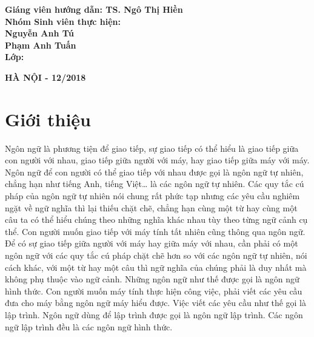\documentclass[14pt]{extreport}
\begin{document}
{\begin{center}
\end{center}
\begin{flushleft}
\vspace{1.3cm}
\hspace{1.5cm} \textbf{ Giáng viên hướng dẫn:{ TS. Ngô Thị Hiền }}\\[0.2cm]
\hspace{1.5cm} \textbf{ Nhóm Sinh viên thực hiện:}\\[0.2cm]
\hspace{5cm}\textbf{Nguyễn Anh Tú}\\[0.2cm]
\hspace{5cm}\textbf{Phạm Anh Tuấn}\\[0.2cm]
\hspace{1.5cm} \textbf{ Lớp:\hspace{2cm}{ KSTN Toán Tin K60}}\\
\end{flushleft}

\begin{center}
\textbf{{\small HÀ NỘI - 12/2018}}\\
\end{center}
 }
\thispagestyle{empty}
\newpage

\tableofcontents
\newpage


\newpage

\chapter{Giới thiệu}
Ngôn ngữ là phương tiện để giao tiếp, sự giao tiếp có thể hiểu là giao tiếp giữa con người với nhau, giao tiếp giữa người với máy, hay giao tiếp giữa máy với máy. Ngôn ngữ để con người có thể giao tiếp với nhau được gọi là ngôn ngữ tự nhiên, chẳng hạn như tiếng Anh, tiếng Việt… là các ngôn ngữ tự nhiên. Các quy tắc cú pháp của ngôn ngữ tự nhiên nói chung rất phức tạp nhưng các yêu cầu nghiêm ngặt về ngữ nghĩa thì lại thiếu chặt chẽ, chẳng hạn cùng một từ hay cùng một câu ta có thể hiểu chúng theo những nghĩa khác nhau tùy theo từng ngữ cảnh cụ thể. Con người muốn giao tiếp với máy tính tất nhiên cũng thông qua ngôn ngữ. Để có sự giao tiếp giữa người với máy hay giữa máy với nhau, cần phải có một ngôn ngữ với các quy tắc cú pháp chặt chẽ hơn so với các ngôn ngữ tự nhiên, nói cách khác, với một từ hay một câu thì ngữ nghĩa của chúng phải là duy nhất mà không phụ thuộc vào ngữ cảnh. Những ngôn ngữ như thế được gọi là ngôn ngữ hình thức. Con người muốn máy tính thực hiện công việc, phải viết các yêu cầu đưa cho máy bằng ngôn ngữ máy hiểu được. Việc viết các yêu cầu như thế gọi là lập trình. Ngôn ngữ dùng để lập trình được gọi là ngôn ngữ lập trình. Các ngôn ngữ lập trình đều là các ngôn ngữ hình thức. 
\end{document}
